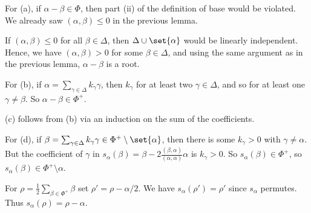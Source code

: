 For (a), if  $\alpha - \beta \in \Phi$, then part (ii) of the definition of base
would be violated. We already saw $(\alpha, \beta) \leq 0$ in the previous lemma.

If $(\alpha, \beta)\leq 0 $ for all $\beta \in \Delta$, then $\Delta \cup \set{\alpha}$
would be linearly independent. Hence, we have $(\alpha, \beta) > 0$ for
some $\beta \in \Delta$, and using the same argument as in the previous
lemma, $\alpha - \beta$ is a root.

For (b), if $\alpha = \sum_{\gamma \in \Delta} k_{\gamma}\gamma$, then $k_\gamma$ for
at least two $\gamma \in \Delta$, and so for at least one $\gamma \neq \beta$. So
$\alpha - \beta \in \Phi^+$.

(c) follows from (b) via an induction on the sum of the coefficients.

For (d), if $\beta = \sum_{\gamma \in\Delta} k_{\gamma}\gamma \in \Phi^+\setminus\set{\alpha}$,
then there is some $k_\gamma > 0$ with $\gamma\neq \alpha$. But the coefficient
of $\gamma$ in $s_\alpha(\beta) = \beta - 2\frac{(\beta, \alpha)}{(\alpha, \alpha)}\alpha$
is $k_\gamma >0$. So $s_\alpha(\beta) \in \Phi^+$, so $s_\alpha(\beta) \in \Phi^+\setminus{\alpha}$.

For $\rho = \frac{1}{2}\sum_{\beta \in \Phi^+}\beta$ set $\rho' = \rho - \alpha/2$.
We have $s_\alpha(\rho') = \rho'$ since $s_\alpha$ permutes. Thus
$s_\alpha(\rho) = \rho - \alpha$.
